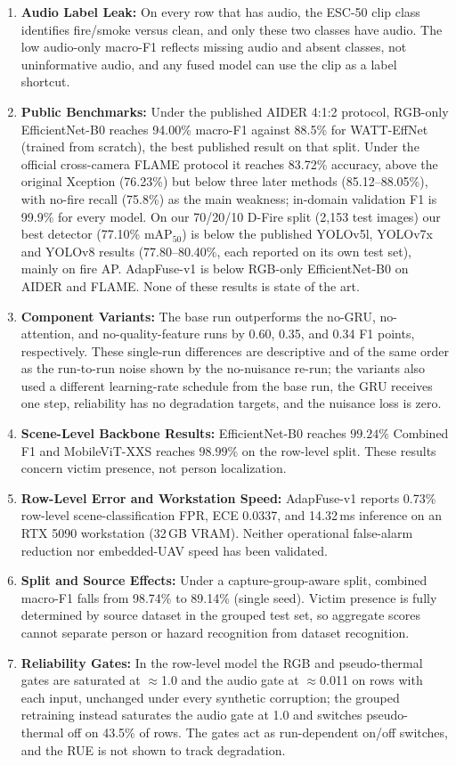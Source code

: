 \documentclass[journal]{IEEEtran}
\begin{document}
\begin{enumerate}
    \item \textbf{Audio Label Leak:} On every row that has audio, the ESC-50 clip class identifies fire/smoke versus clean, and only these two classes have audio. The low audio-only macro-F1 reflects missing audio and absent classes, not uninformative audio, and any fused model can use the clip as a label shortcut.
    \item \textbf{Public Benchmarks:} Under the published AIDER 4:1:2 protocol, RGB-only EfficientNet-B0 reaches 94.00\% macro-F1 against 88.5\% for WATT-EffNet (trained from scratch), the best published result on that split. Under the official cross-camera FLAME protocol it reaches 83.72\% accuracy, above the original Xception (76.23\%) but below three later methods (85.12--88.05\%), with no-fire recall (75.8\%) as the main weakness; in-domain validation F1 is 99.9\% for every model. On our 70/20/10 D-Fire split (2{,}153 test images) our best detector (77.10\% mAP$_{50}$) is below the published YOLOv5l, YOLOv7x and YOLOv8 results (77.80--80.40\%, each reported on its own test set), mainly on fire AP. AdapFuse-v1 is below RGB-only EfficientNet-B0 on AIDER and FLAME. None of these results is state of the art.
    \item \textbf{Component Variants:} The base run outperforms the no-GRU, no-attention, and no-quality-feature runs by 0.60, 0.35, and 0.34 F1 points, respectively. These single-run differences are descriptive and of the same order as the run-to-run noise shown by the no-nuisance re-run; the variants also used a different learning-rate schedule from the base run, the GRU receives one step, reliability has no degradation targets, and the nuisance loss is zero.
    \item \textbf{Scene-Level Backbone Results:} EfficientNet-B0 reaches $99.24\%$ Combined F1 and MobileViT-XXS reaches $98.99\%$ on the row-level split. These results concern victim presence, not person localization.
    \item \textbf{Row-Level Error and Workstation Speed:} AdapFuse-v1 reports 0.73\% row-level scene-classification FPR, ECE 0.0337, and 14.32\,ms inference on an RTX 5090 workstation (32\,GB VRAM). Neither operational false-alarm reduction nor embedded-UAV speed has been validated.
    \item \textbf{Split and Source Effects:} Under a capture-group-aware split, combined macro-F1 falls from 98.74\% to 89.14\% (single seed). Victim presence is fully determined by source dataset in the grouped test set, so aggregate scores cannot separate person or hazard recognition from dataset recognition.
    \item \textbf{Reliability Gates:} In the row-level model the RGB and pseudo-thermal gates are saturated at $\approx$1.0 and the audio gate at $\approx$0.011 on rows with each input, unchanged under every synthetic corruption; the grouped retraining instead saturates the audio gate at 1.0 and switches pseudo-thermal off on 43.5\% of rows. The gates act as run-dependent on/off switches, and the RUE is not shown to track degradation.
\end{enumerate}
\end{document}
